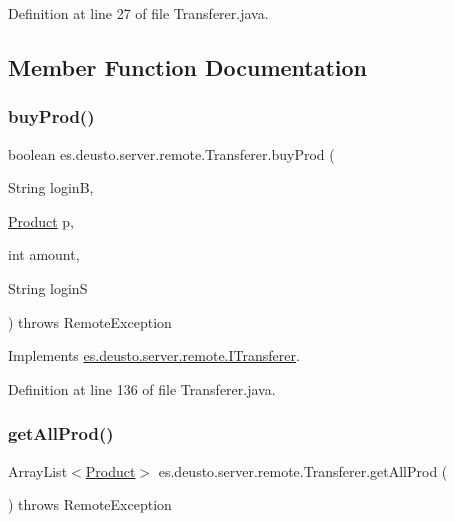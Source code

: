 Definition at line 27 of file Transferer.\+java.



\subsection{Member Function Documentation}
\mbox{\label{classes_1_1deusto_1_1server_1_1remote_1_1_transferer_ad5868dd67ee9a53e7cdf0c30e08a3a1b}} 
\subsubsection{\texorpdfstring{buy\+Prod()}{buyProd()}}
{\footnotesize\ttfamily boolean es.\+deusto.\+server.\+remote.\+Transferer.\+buy\+Prod (\begin{DoxyParamCaption}\item[{String}]{loginB,  }\item[{\hyperlink{classes_1_1deusto_1_1server_1_1db_1_1data_1_1_product}{Product}}]{p,  }\item[{int}]{amount,  }\item[{String}]{loginS }\end{DoxyParamCaption}) throws Remote\+Exception}



Implements \hyperlink{interfacees_1_1deusto_1_1server_1_1remote_1_1_i_transferer_a86d92e8a78257551122807ae02259950}{es.\+deusto.\+server.\+remote.\+I\+Transferer}.



Definition at line 136 of file Transferer.\+java.

\mbox{\label{classes_1_1deusto_1_1server_1_1remote_1_1_transferer_a29cbb75edeb4e0973780fd379ef2b3fb}} 
\subsubsection{\texorpdfstring{get\+All\+Prod()}{getAllProd()}}
{\footnotesize\ttfamily Array\+List$<$\hyperlink{classes_1_1deusto_1_1server_1_1db_1_1data_1_1_product}{Product}$>$ es.\+deusto.\+server.\+remote.\+Transferer.\+get\+All\+Prod (\begin{DoxyParamCaption}{ }\end{DoxyParamCaption}) throws Remote\+Exception}




